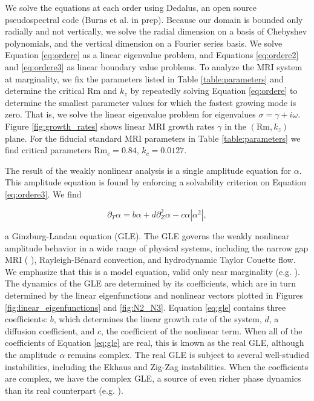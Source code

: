 \documentclass{emulateapj}
\newcommand{\beq}{\begin{equation}}
\newcommand{\eeq}{\end{equation}}
\newcommand{\citei}[1]{\citeauthor{#1} \citeyear{#1}}
\newcommand\reym{\mathrm{Rm}}
\begin{document}
We solve the equations at each order using Dedalus, an open source pseudospectral code (Burns et al. in prep). Because our domain is bounded only radially and not vertically, we solve the radial dimension on a basis of Chebyshev polynomials, and the vertical dimension on a Fourier series basis. We solve Equation \ref{eq:ordere} as a linear eigenvalue problem, and Equations \ref{eq:ordere2} and \ref{eq:ordere3} as linear boundary value problems. %
To analyze the MRI system at marginality, we fix the parameters listed in Table \ref{table:parameters} and determine the critical $\reym$ and $k_z$ by repeatedly solving Equation \ref{eq:ordere} to determine the smallest parameter values for which the fastest growing mode is zero. That is, we solve the linear eigenvalue problem for eigenvalues $\sigma = \gamma + i \omega$. Figure \ref{fig:growth_rates} shows linear MRI growth rates $\gamma$ in the $(\reym, k_z)$ plane. For the fiducial standard MRI parameters in Table \ref{table:parameters} we find critical parameters $\reym_c = 0.84$, $k_c = 0.0127$. 


The result of the weakly nonlinear analysis is a single amplitude equation for $\alpha$. This amplitude equation is found by enforcing a solvability criterion on Equation \ref{eq:ordere3}. We find

\beq
 \label{eq:gle}
\partial_T \alpha = b \alpha + d \partial_Z^2 \alpha - c \alpha \left|\alpha^2\right|,
\eeq

a Ginzburg-Landau equation (GLE). The GLE governs the weakly nonlinear amplitude behavior in a wide range of physical systems, including the narrow gap MRI (\citei{Umurhan:2007hs}), Rayleigh-B\'enard convection, and hydrodynamic Taylor Couette flow. We emphasize that this is a model equation, valid only near marginality (e.g. \citei{Cross:1993el}). The dynamics of the GLE are determined by its coefficients, which are in turn determined by the linear eigenfunctions and nonlinear vectors plotted in Figures \ref{fig:linear_eigenfunctions} and \ref{fig:N2_N3}. Equation \ref{eq:gle} contains three coefficients: $b$, which determines the linear growth rate of the system, $d$, a diffusion coefficient, and $c$, the coefficient of the nonlinear term. When all of the coefficients of Equation \ref{eq:gle} are real, this is known as the real GLE, although the amplitude $\alpha$ remains complex. The real GLE is subject to several well-studied instabilities, including the Ekhaus and Zig-Zag instabilities. When the coefficients are complex, we have the complex GLE, a source of even richer phase dynamics than its real counterpart (e.g. \citei{Aranson:2002}).
\end{document}
